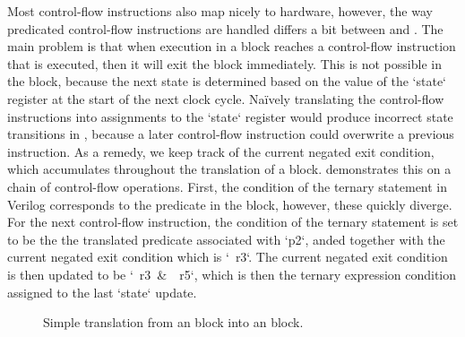 Most control-flow instructions also map nicely to hardware, however, the way
predicated control-flow instructions are handled differs a bit between
\rtlsubpar{} and \htl{}.  The main problem is that when execution in a
\rtlsubpar{} block reaches a control-flow instruction that is executed, then it
will exit the block immediately.  This is not possible in the \htl{} block,
because the next state is determined based on the value of the
\veriloginline`state` register at the start of the next clock cycle.  Na\"ively
translating the control-flow instructions into assignments to the
\veriloginline`state` register would produce incorrect state transitions in
\htl{}, because a later control-flow instruction could overwrite a previous
instruction.  As a remedy, we keep track of the current negated exit condition,
which accumulates throughout the translation of a block.
 demonstrates this on a chain of control-flow
operations.  First, the condition of the ternary statement in Verilog
corresponds to the predicate in the block, however, these quickly diverge.  For
the next control-flow instruction, the condition of the ternary statement is set
to be the the translated predicate associated with \rtlinline`p2`, anded
together with the current negated exit condition which is \veriloginline`~r3`.
The current negated exit condition is then updated to be
\veriloginline`~r3 & ~r5`, which is then the ternary expression condition
assigned to the last \veriloginline`state` update.

\begin{figure}
  \centering
  \caption{Simple translation from an \rtlsubpar{} block into an \htl{} block.}%
  \label{fig:hg:htl-generation}
\end{figure}

